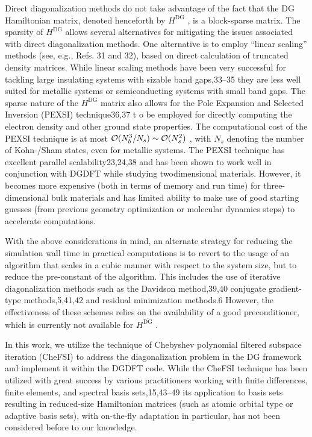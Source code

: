 \documentclass[
  10
]{article}
\begin{document}
Direct diagonalization methods do not take advantage of the fact that
the DG Hamiltonian matrix, denoted henceforth by
\(H ^ { \mathrm { D G } }\) , is a block-sparse matrix. The sparsity of
\(H ^ { \mathrm { D G } }\) allows several alternatives for mitigating
the issues associated with direct diagonalization methods. One
alternative is to employ ``linear scaling'' methods (see, e.g., Refs. 31
and 32), based on direct calculation of truncated density matrices.
While linear scaling methods have been very successful for tackling
large insulating systems with sizable band gaps,33--35 they are less
well suited for metallic systems or semiconducting systems with small
band gaps. The sparse nature of the \(H ^ { \mathrm { D G } }\) matrix
also allows for the Pole Expansion and Selected Inversion (PEXSI)
technique36,37 t o be employed for directly computing the electron
density and other ground state properties. The computational cost of the
PEXSI technique is at most
\({ \cal O } ( N _ { b } ^ { 3 } / N _ { s } ) \sim { \cal O } ( N _ { s } ^ { 2 } )\)
, with \(N _ { s }\) denoting the number of Kohn-/Sham states, even for
metallic systems. The PEXSI technique has excellent parallel
scalability23,24,38 and has been shown to work well in conjunction with
DGDFT while studying twodimensional materials. However, it becomes more
expensive (both in terms of memory and run time) for three-dimensional
bulk materials and has limited ability to make use of good starting
guesses (from previous geometry optimization or molecular dynamics
steps) to accelerate computations.

With the above considerations in mind, an alternate strategy for
reducing the simulation wall time in practical computations is to revert
to the usage of an algorithm that scales in a cubic manner with respect
to the system size, but to reduce the pre-constant of the algorithm.
This includes the use of iterative diagonalization methods such as the
Davidson method,39,40 conjugate gradient-type methods,5,41,42 and
residual minimization methods.6 However, the effectiveness of these
schemes relies on the availability of a good preconditioner, which is
currently not available for \(H ^ { \mathrm { \bar { D G } } }\) .

In this work, we utilize the technique of Chebyshev polynomial filtered
subspace iteration (CheFSI) to address the diagonalization problem in
the DG framework and implement it within the DGDFT code. While the
CheFSI technique has been utilized with great success by various
practitioners working with finite differences, finite elements, and
spectral basis sets,15,43--49 its application to basis sets resulting in
reduced-size Hamiltonian matrices (such as atomic orbital type or
adaptive basis sets), with on-the-fly adaptation in particular, has not
been considered before to our knowledge.
\end{document}
